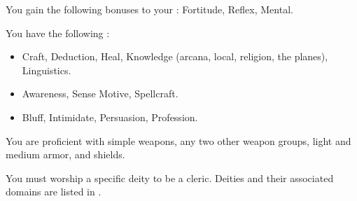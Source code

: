         You gain the following bonuses to your :  Fortitude,  Reflex,  Mental.

        You have the following :
        \begin{itemize}
            \item {} Craft, Deduction, Heal, Knowledge (arcana, local, religion, the planes), Linguistics.
            \item {} Awareness, Sense Motive, Spellcraft.
            \item {} Bluff, Intimidate, Persuasion, Profession.
        \end{itemize}

        You are proficient with simple weapons, any two other weapon groups, light and medium armor, and shields.

        You must worship a specific deity to be a cleric.
        Deities and their associated domains are listed in .

